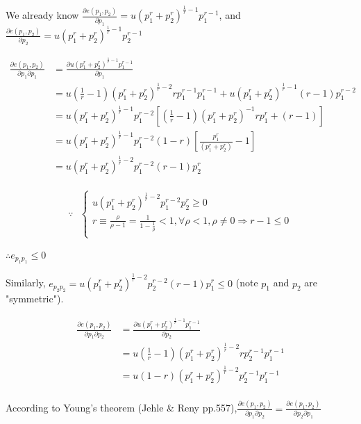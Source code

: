 \documentclass{article}
\begin{document}
\begin{mdframed}[backgroundcolor=blue!20,linecolor=white]
We already know $\frac{\partial e(p_1,p_2)}{\partial p_1} =
u (p_1^{r} + p_2^{r})^{\frac{1}{r} - 1} p_1^{r-1}$, and 
$\frac{\partial e(p_1,p_2)}{\partial p_2} = 
u (p_1^{r} + p_2^{r})^{\frac{1}{r} - 1} p_2^{r-1}$


\begin{align*}
\frac{\partial e(p_1,p_2)}{\partial p_1\partial p_1} &=
\frac{\partial u (p_1^{r} + p_2^{r})^{\frac{1}{r} - 1} p_1^{r-1}}{\partial p_1} \\
&= u (\frac{1}{r} - 1)(p_1^{r} + p_2^{r})^{\frac{1}{r} - 2}rp_1^{r-1}p_1^{r-1} + u(p_1^{r} + p_2^{r})^{\frac{1}{r} - 1}(r-1)p_1^{r-2} \\
&= u(p_1^{r} + p_2^{r})^{\frac{1}{r} - 1} p_1^{r-2}[(\frac{1}{r} - 1)(p_1^{r} + p_2^{r})^{-1}rp_1^{r} + (r-1)] \\
&= u(p_1^{r} + p_2^{r})^{\frac{1}{r} - 1} p_1^{r-2} (1-r)[\frac{p_1^{r}}{(p_1^{r} + p_2^{r})} - 1] \\
&= u(p_1^{r} + p_2^{r})^{\frac{1}{r} - 2} p_1^{r-2} (r-1)p_2^r \\
\end{align*}

\begin{equation}
\because \ \ \
    \begin{cases}
u(p_1^{r} + p_2^{r})^{\frac{1}{r} - 2} p_1^{r-2}p_2^r \ge 0 \\
r \equiv \frac{\rho}{\rho - 1} = \frac{1}{1 - \frac{1}{\rho}} < 1, \forall \rho < 1, \rho \ne 0 \Rightarrow r-1 \le 0 \\
    \end{cases}
\nonumber
\end{equation}

$\therefore e_{p_1p_1} \le 0$

Similarly, $e_{p_2p_2} = u(p_1^{r} + p_2^{r})^{\frac{1}{r} - 2} p_2^{r-2} (r-1)p_1^r \le 0$ (note $p_1$ and $p_2$ are "symmetric").

\begin{align*}
\frac{\partial e(p_1,p_2)}{\partial p_1\partial p_2} &=
\frac{\partial u (p_1^{r} + p_2^{r})^{\frac{1}{r} - 1} p_1^{r-1}}{\partial p_2} \\
&= u ({\frac{1}{r} - 1})(p_1^{r} + p_2^{r})^{\frac{1}{r} - 2} rp_2^{r-1}p_1^{r-1} \\
&= u (1-r)(p_1^{r} + p_2^{r})^{\frac{1}{r} - 2} p_2^{r-1}p_1^{r-1} \\
\end{align*}

According to Young's theorem (Jehle \& Reny pp.557),$\frac{\partial e(p_1,p_2)}{\partial p_1\partial p_2} = \frac{\partial e(p_1,p_2)}{\partial p_2\partial p_1}$ 


\end{mdframed}
\end{document}
